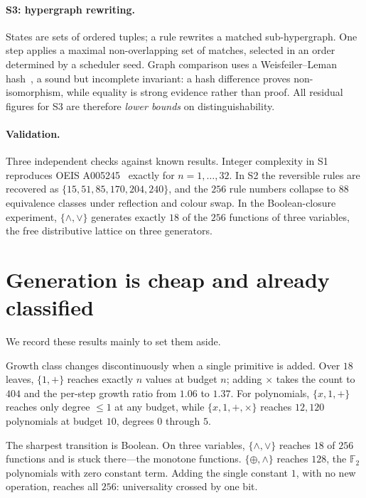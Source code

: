 \documentclass[11pt]{article}
\begin{document}
\paragraph{S3: hypergraph rewriting.}
States are sets of ordered tuples; a rule rewrites a matched sub-hypergraph. One step
applies a maximal non-overlapping set of matches, selected in an order determined by a
scheduler seed. Graph comparison uses a Weisfeiler--Leman
hash~\cite{weisfeiler1968}, a sound but incomplete invariant: a hash difference
proves non-isomorphism, while equality is strong evidence rather than proof. All
residual figures for S3 are therefore \emph{lower bounds} on distinguishability.

\paragraph{Validation.}
Three independent checks against known results. Integer complexity in S1 reproduces
OEIS A005245~\cite{oeis005245} exactly for $n=1,\dots,32$. In S2 the reversible rules
are recovered as $\{15,51,85,170,204,240\}$, and the $256$ rule numbers collapse to
$88$ equivalence classes under reflection and colour swap. In the Boolean-closure
experiment, $\{\wedge,\vee\}$ generates exactly $18$ of the $256$ functions of three
variables, the free distributive lattice on three generators.

\section{Generation is cheap and already classified}\label{sec:generation}

We record these results mainly to set them aside.

Growth class changes discontinuously when a single primitive is added. Over $18$
leaves, $\{1,+\}$ reaches exactly $n$ values at budget $n$; adding $\times$ takes the
count to $404$ and the per-step growth ratio from $1.06$ to $1.37$. For polynomials,
$\{x,1,+\}$ reaches only degree $\le 1$ at any budget, while $\{x,1,+,\times\}$ reaches
$12{,}120$ polynomials at budget $10$, degrees $0$ through $5$.

The sharpest transition is Boolean. On three variables, $\{\wedge,\vee\}$ reaches $18$
of $256$ functions and is stuck there---the monotone functions. $\{\oplus,\wedge\}$
reaches $128$, the $\mathbb{F}_2$ polynomials with zero constant term. Adding the
single constant $1$, with no new operation, reaches all $256$: universality crossed by
one bit.
\end{document}
